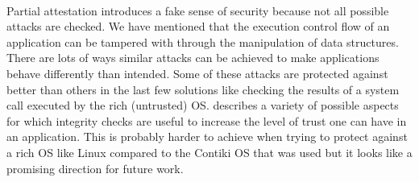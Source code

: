 \paragraph*{}
Partial attestation introduces a fake sense of security because not all possible attacks are checked. We have mentioned that the execution control flow of an application can be tampered with through the manipulation of data structures. There are lots of ways similar attacks can be achieved to make applications behave differently than intended. Some of these attacks are protected against better than others in the last few solutions like checking the results of a system call executed by the rich (untrusted) OS. \cite{MuhlbergJanTobias2016LaFT} describes a variety of possible aspects for which integrity checks are useful to increase the level of trust one can have in an application. This is probably harder to achieve when trying to protect against a rich OS like Linux compared to the Contiki OS that was used but it looks like a promising direction for future work.